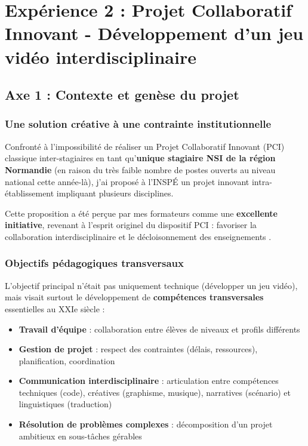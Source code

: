 \chapter{Expérience 2 : Projet Collaboratif Innovant - Développement d'un jeu vidéo interdisciplinaire}

\section{Axe 1 : Contexte et genèse du projet}

\subsection{Une solution créative à une contrainte institutionnelle}

Confronté à l'impossibilité de réaliser un Projet Collaboratif Innovant (PCI) classique inter-stagiaires en tant qu'\textbf{unique stagiaire NSI de la région Normandie} (en raison du très faible nombre de postes ouverts au niveau national cette année-là), j'ai proposé à l'INSPÉ un projet innovant intra-établissement impliquant plusieurs disciplines.

Cette proposition a été perçue par mes formateurs comme une \textbf{excellente initiative}, revenant à l'esprit originel du dispositif PCI : favoriser la collaboration interdisciplinaire et le décloisonnement des enseignements \parencite{referentiel_meef,projet_travail_groupe}.

\subsection{Objectifs pédagogiques transversaux}

L'objectif principal n'était pas uniquement technique (développer un jeu vidéo), mais visait surtout le développement de \textbf{compétences transversales} essentielles au XXIe siècle \parencite{competences_transversales_eurecia,competences_21_siecle}:

\begin{itemize}[leftmargin=*]
    \item \textbf{Travail d'équipe} : collaboration entre élèves de niveaux et profils différents
    \item \textbf{Gestion de projet} : respect des contraintes (délais, ressources), planification, coordination
    \item \textbf{Communication interdisciplinaire} : articulation entre compétences techniques (code), créatives (graphisme, musique), narratives (scénario) et linguistiques (traduction)
    \item \textbf{Résolution de problèmes complexes} : décomposition d'un projet ambitieux en sous-tâches gérables
\end{itemize}

